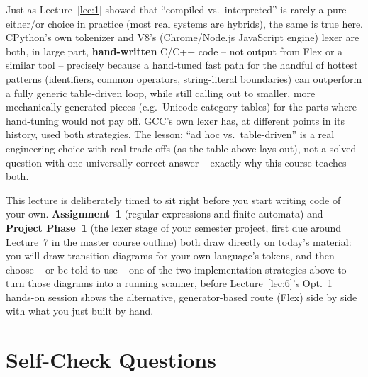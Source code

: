 \documentclass[full-course-notes.tex]{subfiles}
\begin{document}
\begin{enrichment}
\label{sec:l7-hybrid-reality}
Just as Lecture~\ref{lec:1} showed that ``compiled vs.\ interpreted'' is rarely a pure either/or
choice in practice (most real systems are hybrids), the same is true here. CPython's own
tokenizer and V8's (Chrome/Node.js JavaScript engine) lexer are both, in large part,
\textbf{hand-written} C/C++ code -- not output from Flex or a similar tool -- precisely because
a hand-tuned fast path for the handful of hottest patterns (identifiers, common operators,
string-literal boundaries) can outperform a fully generic table-driven loop, while still calling
out to smaller, more mechanically-generated pieces (e.g.\ Unicode category tables) for the parts
where hand-tuning would not pay off. GCC's own lexer has, at different points in its history,
used both strategies. The lesson: ``ad hoc vs.\ table-driven'' is a real engineering choice with
real trade-offs (as the table above lays out), not a solved question with one universally
correct answer -- exactly why this course teaches both.
\end{enrichment}

\begin{coreidea}
This lecture is deliberately timed to sit right before you start writing code of your own.
\textbf{Assignment~1} (regular expressions and finite automata) and \textbf{Project Phase~1}
(the lexer stage of your semester project, first due around Lecture~7 in the master course
outline) both draw directly on today's material: you will draw transition diagrams for your own
language's tokens, and then choose -- or be told to use -- one of the two implementation
strategies above to turn those diagrams into a running scanner, before Lecture~\ref{lec:6}'s
Opt.~1 hands-on session shows the alternative, generator-based route (Flex) side by side with
what you just built by hand.
\end{coreidea}

\section{Self-Check Questions}
\label{sec:l7-selfcheck}
\end{document}
